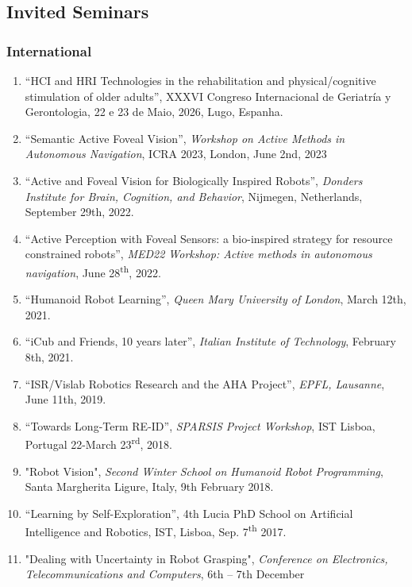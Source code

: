 \documentclass[
]{article}
\begin{document}
\subsection{Invited Seminars}\label{invited-seminars}

\subsubsection{International}\label{international}

\begin{enumerate}
\def\labelenumi{\arabic{enumi}.}
\item
  ``HCI and HRI Technologies in the rehabilitation and
  physical/cognitive stimulation of older adults'', XXXVI Congreso
  Internacional de Geriatría y Gerontologia, 22 e 23 de Maio, 2026,
  Lugo, Espanha.
\item
  ``Semantic Active Foveal Vision'', \emph{Workshop on Active Methods in
  Autonomous Navigation}, ICRA 2023, London, June 2nd, 2023
\item
  ``Active and Foveal Vision for Biologically Inspired Robots'',
  \emph{Donders Institute for Brain, Cognition, and Behavior}, Nijmegen,
  Netherlands, September 29th, 2022.
\item
  ``Active Perception with Foveal Sensors: a bio-inspired strategy for
  resource constrained robots'', \emph{MED22 Workshop: Active methods in
  autonomous navigation}, June 28\textsuperscript{th}, 2022.
\item
  ``Humanoid Robot Learning'', \emph{Queen Mary University of London},
  March 12th, 2021.
\item
  ``iCub and Friends, 10 years later'', \emph{Italian Institute of
  Technology}, February 8th, 2021.
\item
  ``ISR/Vislab Robotics Research and the AHA Project'', \emph{EPFL,
  Lausanne}, June 11th, 2019.
\item
  ``Towards Long-Term RE-ID'', \emph{SPARSIS Project Workshop}, IST
  Lisboa, Portugal 22-March 23\textsuperscript{rd}, 2018.
\item
  "Robot Vision", \emph{Second Winter School on Humanoid Robot
  Programming}, Santa Margherita Ligure, Italy, 9th February 2018.
\item
  ``Learning by Self-Exploration'', 4th Lucia PhD School on Artificial
  Intelligence and Robotics, IST, Lisboa, Sep. 7\textsuperscript{th}
  2017.
\item
  "Dealing with Uncertainty in Robot Grasping", \emph{Conference on
  Electronics, Telecommunications and Computers}, 6th -- 7th December

\end{enumerate}
\end{document}
